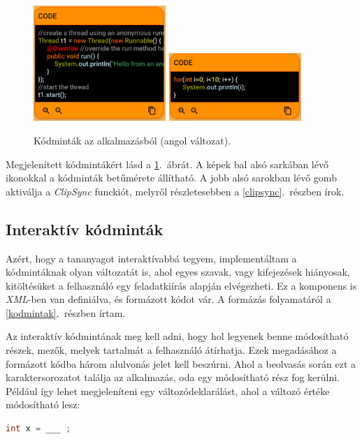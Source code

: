 \documentclass[12pt,a4paper]{article}
\newcommand{\xml}{\textit{XML}\xspace}
\begin{document}
	\begin{figure}
		\centering
		\includegraphics[width=5cm]{code_component_1}
		\includegraphics[width=5cm]{code_component_2}
		\caption{Kódminták az alkalmazásból (angol változat).}
		\label{code_component_figure}
	\end{figure}
	
	Megjelenített kódmintákért lásd a \ref{code_component_figure}.\ ábrát. A képek bal alsó sarkában lévő ikonokkal a kódminták betűmérete állítható. A jobb alsó sarokban lévő gomb aktiválja a \textit{ClipSync} funckiót, melyről részletesebben a \ref{clipsync}.\ részben írok.
	
	\subsection{Interaktív kódminták}\label{interaktiv_kodmintak}
	
	Azért, hogy a tananyagot interaktívabbá tegyem, implementáltam a kódmintáknak olyan változatát is, ahol egyes szavak, vagy kifejezések hiányosak, kitöltésüket a felhasználó egy feladatkiírás alapján elvégezheti. Ez a komponens is \xml-ben van definiálva, és formázott kódot vár. A formázás folyamatáról a \ref{kodmintak}.\ részben írtam.
	
	Az interaktív kódmintának meg kell adni, hogy hol legyenek benne módosítható részek, mezők, melyek tartalmát a felhasználó átírhatja. Ezek megadásához a formázott kódba három alulvonás jelet kell beszúrni. Ahol a beolvasás során ezt a karaktersorozatot találja az alkalmazás, oda egy módosítható rész fog kerülni. Például így lehet megjeleníteni egy változódeklarálást, ahol a változó értéke módosítható lesz:
	
	\bigskip
	\begin{lstlisting}[language=Java]
	int x = ___ ;
	\end{lstlisting}  
	\bigskip
	
\end{document}
